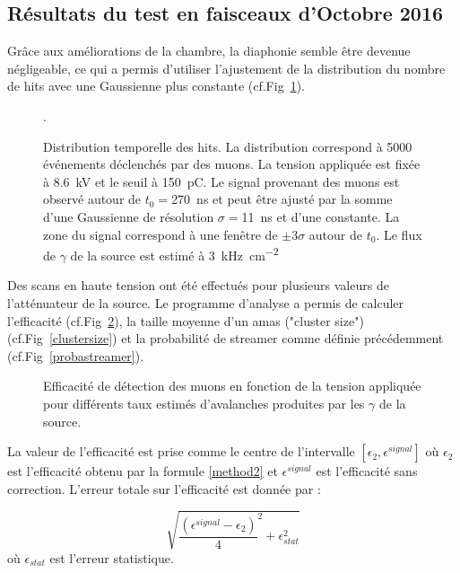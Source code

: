 \subsection{Résultats du test en faisceaux d'Octobre 2016}
Grâce aux améliorations de la chambre, la diaphonie semble être devenue négligeable, ce qui a permis d'utiliser l'ajustement de la distribution du nombre de hits avec une Gaussienne plus constante (cf.Fig~\ref{ajust}).
\begin{figure}[!ht]
	\centering
	\caption{Distribution temporelle des hits. La distribution correspond à \num{5000} événements déclenchés par des muons. La tension appliquée est fixée à \SI{8.6}{\kilo\volt} et le seuil à \SI{150}{\pico\coulomb}. Le signal provenant des muons est observé autour de $t_0=$\SI{270}{\nano\second} et peut être ajusté par la somme d'une Gaussienne de résolution $\sigma=$\SI{11}{\nano\second} et d'une constante. La zone du signal correspond à une fenêtre de $\pm 3 \sigma$ autour de $t_0$. Le flux de $\gamma$ de la source est estimé à \SI{3}{\kilo\hertz\per\square\centi\meter}}.
	\label{ajust}
\end{figure}

 Des scans en haute tension ont été effectués pour plusieurs valeurs de l'atténuateur de la source. Le programme d'analyse a permis de calculer l'efficacité (cf.Fig~\ref{effifi}), la taille moyenne d'un amas ("cluster size") (cf.Fig~\ref{clustersize}) et la probabilité de streamer comme définie précédemment (cf.Fig~\ref{probastreamer}).

 \begin{figure}[!ht]
 	\centering
 	\caption{Efficacité de détection des muons en fonction de la tension appliquée pour différents taux estimés d'avalanches produites par les $\gamma$ de la source.}
 	\label{effifi}
 \end{figure}

\newpage
La valeur de l'efficacité est prise comme le centre de l'intervalle $\left[\epsilon_2,\epsilon^{signal}\right]$ où $\epsilon_2$ est l'efficacité obtenu par la formule \ref{method2} et $\epsilon^{signal}$ est l'efficacité sans correction. L'erreur totale sur l'efficacité est donnée par :

\begin{equation}
\sqrt{{\frac{\left(\epsilon^{signal}-\epsilon_2\right)}{4}}^2+\epsilon_{stat}^2}
\end{equation}
où $\epsilon_{stat}$ est l'erreur statistique.

